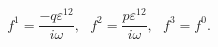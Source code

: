 \begin{equation}
f^1 = \frac{-q\varepsilon^{12}}{i\omega},~~~
f^2 =  \frac{p\varepsilon^{12}}{i\omega}, ~~~
f^3 = f^0.
\label{2001}
\end{equation}

